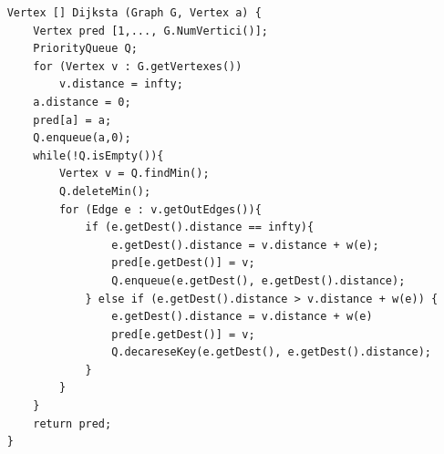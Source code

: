 \documentclass{article}
\begin{document}
\begin{verbatim}
    Vertex [] Dijksta (Graph G, Vertex a) {
        Vertex pred [1,..., G.NumVertici()];
        PriorityQueue Q;
        for (Vertex v : G.getVertexes())
            v.distance = infty;
        a.distance = 0;
        pred[a] = a;
        Q.enqueue(a,0);
        while(!Q.isEmpty()){
            Vertex v = Q.findMin();
            Q.deleteMin();
            for (Edge e : v.getOutEdges()){
                if (e.getDest().distance == infty){
                    e.getDest().distance = v.distance + w(e);
                    pred[e.getDest()] = v;
                    Q.enqueue(e.getDest(), e.getDest().distance);
                } else if (e.getDest().distance > v.distance + w(e)) {
                    e.getDest().distance = v.distance + w(e)
                    pred[e.getDest()] = v;
                    Q.decareseKey(e.getDest(), e.getDest().distance);
                }
            }
        }
        return pred;
    }
\end{verbatim}
\end{document}
